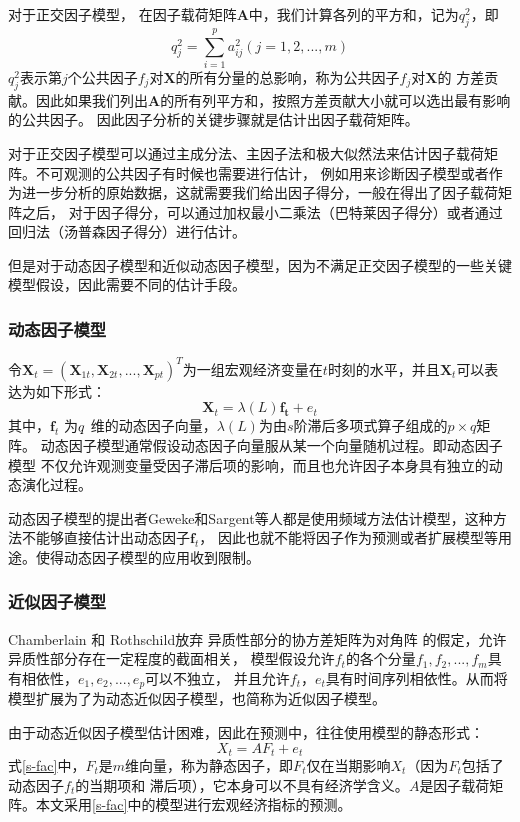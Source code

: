 对于正交因子模型，
在因子载荷矩阵$\bm{A}$中，我们计算各列的平方和，记为$q_j^2$，即
\begin{equation}
    q_j^2 = \sum_{i=1}^p a_{ij}^2 (j = 1, 2, ..., m)
\end{equation}
$q_j^2$表示第$j$个公共因子$f_j$对$\bm{X}$的所有分量的总影响，称为公共因子$f_j$对$\bm{X}$的
方差贡献。因此如果我们列出$\bm{A}$的所有列平方和，按照方差贡献大小就可以选出最有影响的公共因子。
因此因子分析的关键步骤就是估计出因子载荷矩阵。

对于正交因子模型可以通过主成分法、主因子法和极大似然法来估计因子载荷矩阵。不可观测的公共因子有时候也需要进行估计，
例如用来诊断因子模型或者作为进一步分析的原始数据，这就需要我们给出因子得分，一般在得出了因子载荷矩阵之后，
对于因子得分，可以通过加权最小二乘法（巴特莱因子得分）或者通过回归法（汤普森因子得分）进行估计。

但是对于动态因子模型和近似动态因子模型，因为不满足正交因子模型的一些关键模型假设，因此需要不同的估计手段。
\subsubsection{动态因子模型}

令$\bm{X}_t = (\bm{X}_{1t},\bm{X}_{2t}, ..., \bm{X}_{pt})^T$为一组宏观经济变量在$t$时刻的水平，并且$\bm{X}_t$可以表达为如下形式：
\begin{equation}
    \bm{X}_t = \lambda(L)\bm{f_t} + e_t
\end{equation}
其中，$\bm{f}_t$ 为$q\time 1$ 维的动态因子向量，$\lambda(L)$为由$s$阶滞后多项式算子组成的$p \times q$矩阵。
动态因子模型通常假设动态因子向量服从某一个向量随机过程。即动态因子模型
不仅允许观测变量受因子滞后项的影响，而且也允许因子本身具有独立的动态演化过程。

动态因子模型的提出者Geweke和Sargent等人都是使用频域方法估计模型，这种方法不能够直接估计出动态因子$\bm{f}_t$，
因此也就不能将因子作为预测或者扩展模型等用途。使得动态因子模型的应用收到限制。

\subsubsection{近似因子模型}
Chamberlain 和 Rothschild放弃 异质性部分的协方差矩阵为对角阵 的假定，允许异质性部分存在一定程度的截面相关， 
模型假设允许$f_t$的各个分量$f_1, f_2, ..., f_m$具有相依性，$e_1, e_2, ..., e_p$可以不独立，
并且允许$f_t$，$e_t$具有时间序列相依性。从而将模型扩展为了为动态近似因子模型，也简称为近似因子模型。

由于动态近似因子模型估计困难，因此在预测中，往往使用模型的静态形式：
\begin{equation}\label{s-fac}
X_t = AF_t + e_t
\end{equation}
式\eqref{s-fac}中，$F_t$是$m$维向量，称为静态因子，即$F_t$仅在当期影响$X_t$（因为$F_t$包括了动态因子$f_t$的当期项和
滞后项），它本身可以不具有经济学含义。$A$是因子载荷矩阵。本文采用\eqref{s-fac}中的模型进行宏观经济指标的预测。

